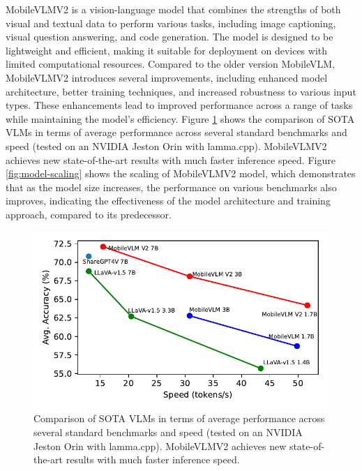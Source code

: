 \documentclass[conference]{IEEEtran}
\begin{document}
MobileVLMV2\cite{chu2024mobilevlm} is a vision-language model that combines the strengths of both visual and textual data to perform various tasks, including image captioning, visual question answering, and code generation. The model is designed to be lightweight and efficient, making it suitable for deployment on devices with limited computational resources.
Compared to the older version MobileVLM\cite{chu2023mobilevlm}, MobileVLMV2\cite{chu2024mobilevlm} introduces several improvements, including enhanced model architecture, better training techniques, and increased robustness to various input types. These enhancements lead to improved performance across a range of tasks while maintaining the model's efficiency.
Figure \ref{fig:latency-comparison-mobile} shows the comparison of SOTA VLMs in terms of average performance across several standard benchmarks and speed (tested on an NVIDIA Jeston Orin with lamma.cpp). MobileVLMV2 achieves new state-of-the-art results with much faster inference speed. Figure \ref{fig:model-scaling} shows the scaling of MobileVLMV2 model, which demonstrates that as the model size increases, the performance on various benchmarks also improves, indicating the effectiveness of the model architecture and training approach, compared to its predecessor.
\begin{figure}[t]
  \centering
   \includegraphics[width=.87\columnwidth]{figures/mobilevlm_latency_mobile.pdf}
   \caption{Comparison of SOTA VLMs in terms of average performance across several standard benchmarks and speed (tested on an NVIDIA Jeston Orin with lamma.cpp). MobileVLMV2 achieves new state-of-the-art results with much faster inference speed.}
   \label{fig:latency-comparison-mobile}
\end{figure}
\end{document}

